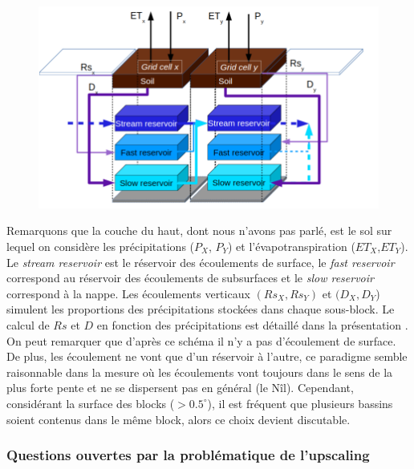 \documentclass[a4paper,11pt]{article}
\numberwithin{equation}{section}
\begin{document}
\begin{figure}[H]
	\begin{center}
		\includegraphics[scale=0.3]{Orchidee_interaction.png}
	\end{center}
	\label{fig-Orchidee-interact}
\end{figure}

Remarquons que la couche du haut, dont nous n'avons pas parlé, est le sol sur lequel on considère les précipitations ($P_X$, $P_Y$) et l'évapotranspiration ($ET_X$,$ET_Y$). Le \textit{stream reservoir} est le réservoir des écoulements de surface, le \textit{fast reservoir} correspond au réservoir des écoulements de subsurfaces et le \textit{slow reservoir} correspond à la nappe. Les écoulements verticaux $(Rs_X,Rs_Y)$ et $(D_X,D_Y$) simulent les proportions des précipitations stockées dans chaque sous-block. Le calcul de $Rs$ et $D$ en fonction des précipitations est détaillé dans la présentation \cite{gumiberteau2017}. On peut remarquer que d'après ce schéma il n'y a pas d'écoulement de surface.
De plus, les écoulement ne vont que d'un réservoir à l'autre, ce paradigme semble raisonnable dans la mesure où les écoulements vont toujours dans le sens de la plus forte pente et ne se dispersent pas en général (le Nîl). Cependant, considérant la surface des blocks ($>0.5^{\circ}$), il est fréquent que plusieurs bassins soient contenus dans le même block, alors ce choix devient discutable.

\subsubsection{Questions ouvertes par la problématique de l'upscaling}
\end{document}
